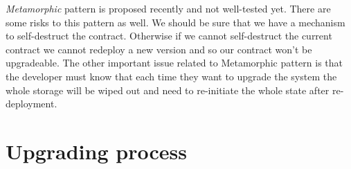 \textit{Metamorphic} pattern is proposed recently and not well-tested yet. There are some risks to this pattern as well. We should be sure that we have a mechanism to self-destruct the contract. Otherwise if we cannot self-destruct the current contract we cannot redeploy a new version and so our contract won't be upgradeable. The other important issue related to Metamorphic pattern is that the developer must know that each time they want to upgrade the system the whole storage will be wiped out and need to re-initiate the whole state after re-deployment. 


 \section{Upgrading process}
 



